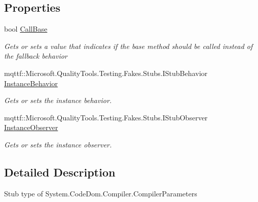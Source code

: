\subsection*{Properties}
\begin{DoxyCompactItemize}
\item 
bool \hyperlink{class_system_1_1_code_dom_1_1_compiler_1_1_fakes_1_1_stub_compiler_parameters_a222fa8d7620e64fb6986c6820ab6d473}{Call\-Base}
\begin{DoxyCompactList}\small\item\em Gets or sets a value that indicates if the base method should be called instead of the fallback behavior\end{DoxyCompactList}\item 
mqttf\-::\-Microsoft.\-Quality\-Tools.\-Testing.\-Fakes.\-Stubs.\-I\-Stub\-Behavior \hyperlink{class_system_1_1_code_dom_1_1_compiler_1_1_fakes_1_1_stub_compiler_parameters_a73f657778349aae0375585cc3cba4d57}{Instance\-Behavior}
\begin{DoxyCompactList}\small\item\em Gets or sets the instance behavior.\end{DoxyCompactList}\item 
mqttf\-::\-Microsoft.\-Quality\-Tools.\-Testing.\-Fakes.\-Stubs.\-I\-Stub\-Observer \hyperlink{class_system_1_1_code_dom_1_1_compiler_1_1_fakes_1_1_stub_compiler_parameters_a43e60a8b7bf332635aadf87028dfb7a2}{Instance\-Observer}
\begin{DoxyCompactList}\small\item\em Gets or sets the instance observer.\end{DoxyCompactList}\end{DoxyCompactItemize}


\subsection{Detailed Description}
Stub type of System.\-Code\-Dom.\-Compiler.\-Compiler\-Parameters



